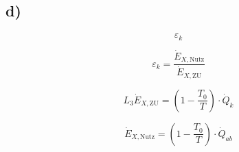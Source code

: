 

\subsection*{d)}

\[
\varepsilon_k
\]

\[
\varepsilon_k = \frac{\dot{E}_{X,\text{Nutz}}}{\dot{E}_{X,\text{ZU}}}
\]

\[
L_3 \dot{E}_{X,\text{ZU}} = \left(1 - \frac{T_0}{T}\right) \cdot \dot{Q}_k
\]

\[
\dot{E}_{X,\text{Nutz}} = \left(1 - \frac{T_0}{T}\right) \cdot \dot{Q}_{ab}
\]